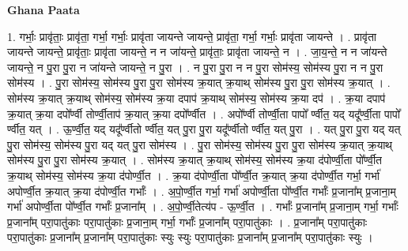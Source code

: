 \documentclass[17pt]{extarticle}
\begin{document}
\textbf{Ghana Paata } \newline

1. गर्भाः॒ प्रावृ॑ताः॒ प्रावृ॑ता॒ गर्भा॒ गर्भाः॒ प्रावृ॑ता जायन्ते जायन्ते॒ प्रावृ॑ता॒ गर्भा॒ गर्भाः॒ प्रावृ॑ता जायन्ते । . प्रावृ॑ता जायन्ते जायन्ते॒ प्रावृ॑ताः॒ प्रावृ॑ता जायन्ते॒ न न जा॑यन्ते॒ प्रावृ॑ताः॒ प्रावृ॑ता जायन्ते॒ न । . जा॒य॒न्ते॒ न न जा॑यन्ते जायन्ते॒ न पु॒रा पु॒रा न जा॑यन्ते जायन्ते॒ न पु॒रा । . न पु॒रा पु॒रा न न पु॒रा सोम॑स्य॒ सोम॑स्य पु॒रा न न पु॒रा सोम॑स्य । . पु॒रा सोम॑स्य॒ सोम॑स्य पु॒रा पु॒रा सोम॑स्य क्र॒यात् क्र॒याथ् सोम॑स्य पु॒रा पु॒रा सोम॑स्य क्र॒यात् । . सोम॑स्य क्र॒यात् क्र॒याथ् सोम॑स्य॒ सोम॑स्य क्र॒या दपाप॑ क्र॒याथ् सोम॑स्य॒ सोम॑स्य क्र॒या दप॑ । . क्र॒या दपाप॑ क्र॒यात् क्र॒या दपो᳚र्ण्वी तोर्ण्वी॒ताप॑ क्र॒यात् क्र॒या दपो᳚र्ण्वीत । . अपो᳚र्ण्वी तोर्ण्वी॒ता पापो᳚ र्ण्वीत॒ यद् यदू᳚र्ण्वी॒ता पापो᳚ र्ण्वीत॒ यत् । . ऊ॒र्ण्वी॒त॒ यद् यदू᳚र्ण्वीतो र्ण्वीत॒ यत् पु॒रा पु॒रा यदू᳚र्ण्वीतो र्ण्वीत॒ यत् पु॒रा । . यत् पु॒रा पु॒रा यद् यत् पु॒रा सोम॑स्य॒ सोम॑स्य पु॒रा यद् यत् पु॒रा सोम॑स्य । . पु॒रा सोम॑स्य॒ सोम॑स्य पु॒रा पु॒रा सोम॑स्य क्र॒यात् क्र॒याथ् सोम॑स्य पु॒रा पु॒रा सोम॑स्य क्र॒यात् । . सोम॑स्य क्र॒यात् क्र॒याथ् सोम॑स्य॒ सोम॑स्य क्र॒या द॑पोर्ण्वी॒ता पो᳚र्ण्वी॒त क्र॒याथ् सोम॑स्य॒ सोम॑स्य क्र॒या द॑पोर्ण्वी॒त । . क्र॒या द॑पोर्ण्वी॒ता पो᳚र्ण्वी॒त क्र॒यात् क्र॒या द॑पोर्ण्वी॒त गर्भा॒ गर्भा॑ अपोर्ण्वी॒त क्र॒यात् क्र॒या द॑पोर्ण्वी॒त गर्भाः᳚ । . अ॒पो॒र्ण्वी॒त गर्भा॒ गर्भा॑ अपोर्ण्वी॒ता पो᳚र्ण्वी॒त गर्भाः᳚ प्र॒जाना᳚म् प्र॒जाना॒म् गर्भा॑ अपोर्ण्वी॒ता पो᳚र्ण्वी॒त गर्भाः᳚ प्र॒जाना᳚म् । . अ॒पो॒र्ण्वी॒तेत्य॑प - ऊ॒र्ण्वी॒त । . गर्भाः᳚ प्र॒जाना᳚म् प्र॒जाना॒म् गर्भा॒ गर्भाः᳚ प्र॒जाना᳚म् परा॒पातु॑काः परा॒पातु॑काः प्र॒जाना॒म् गर्भा॒ गर्भाः᳚ प्र॒जाना᳚म् परा॒पातु॑काः । . प्र॒जाना᳚म् परा॒पातु॑काः परा॒पातु॑काः प्र॒जाना᳚म् प्र॒जाना᳚म् परा॒पातु॑काः स्युः स्युः परा॒पातु॑काः प्र॒जाना᳚म् प्र॒जाना᳚म् परा॒पातु॑काः स्युः । \newline
\end{document}
